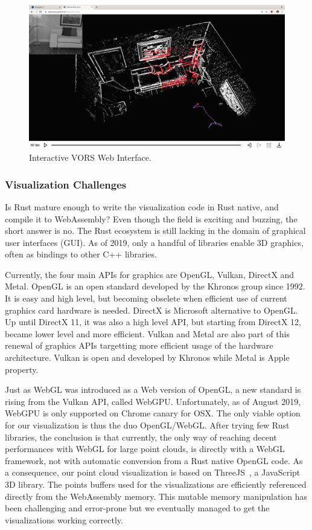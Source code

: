 \begin{figure}[ht]
	\centering
	\includegraphics[width=\linewidth]{assets/img/interactive-vors.png}
	\caption{Interactive VORS Web Interface.}%
	\label{fig:interactive-vors-interface}
\end{figure}

\subsubsection{Visualization Challenges}%

Is Rust mature enough to write the visualization code in Rust native,
and compile it to WebAssembly?
Even though the field is exciting and buzzing, the short answer is no.
The Rust ecosystem is still lacking in the domain of graphical user interfaces (GUI).
As of 2019, only a handful of libraries enable 3D graphics,
often as bindings to other C++ libraries.

Currently, the four main APIs for graphics are OpenGL, Vulkan, DirectX and Metal.
OpenGL is an open standard developed by the Khronos group since 1992.
It is easy and high level, but becoming obselete
when efficient use of current graphics card hardware is needed.
DirectX is Microsoft alternative to OpenGL.\@
Up until DirectX 11, it was also a high level API,
but starting from DirectX 12, became lower level and more efficient.
Vulkan and Metal are also part of this renewal of graphics APIs
targetting more efficient usage of the hardware architecture.
Vulkan is open and developed by Khronos while Metal is Apple property.

Just as WebGL was introduced as a Web version of OpenGL,
a new standard is rising from the Vulkan API, called WebGPU.\@
Unfortunately, as of August 2019, WebGPU is only supported on Chrome canary for OSX.\@
The only viable option for our visualization is thus the duo OpenGL/WebGL.\@
After trying few Rust libraries, the conclusion is that currently,
the only way of reaching decent performances with WebGL for large point clouds,
is directly with a WebGL framework,
not with automatic conversion from a Rust native OpenGL code.
As a consequence, our point cloud visualization is based on ThreeJS~\cite{threejs},
a JavaScript 3D library.
The points buffers used for the visualizations are efficiently referenced
directly from the WebAssembly memory.
This mutable memory manipulation has been challenging and error-prone
but we eventually managed to get the visualizations working correctly.


